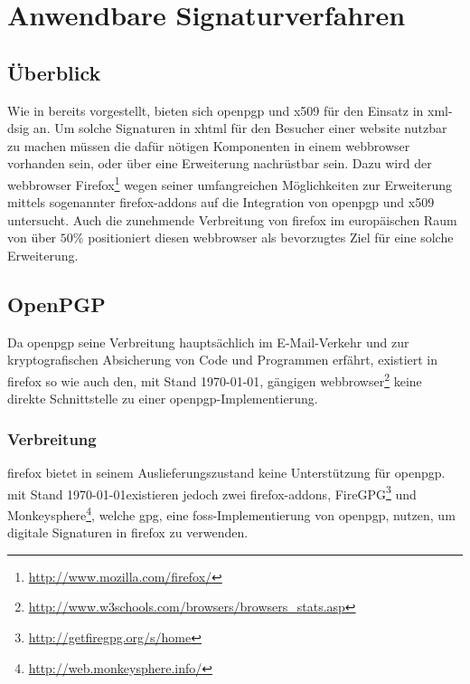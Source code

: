 
\chapter{Anwendbare Signaturverfahren}
\label{chap:Signaturverfahren}

\section{Überblick}
Wie in  bereits vorgestellt, bieten sich \gls{openpgp} und \gls{x509} für den Einsatz in
\gls{xml-dsig} an. Um solche Signaturen in \gls{xhtml} für den Besucher einer \gls{website} nutzbar zu machen müssen die dafür nötigen Komponenten in einem
\gls{webbrowser} vorhanden sein, oder über eine Erweiterung nachrüstbar sein. Dazu wird der \gls{webbrowser}
Firefox\footnote{\url{http://www.mozilla.com/firefox/}} wegen seiner umfangreichen Möglichkeiten zur Erweiterung mittels sogenannter
\glspl{firefox-addon} auf die Integration von \gls{openpgp} und \gls{x509} untersucht. Auch die zunehmende Verbreitung von \gls{firefox} im europäischen Raum
von über $50\%$ \cite{firefox-verbreitung} positioniert diesen \gls{webbrowser} als bevorzugtes Ziel für eine solche Erweiterung.

\section{OpenPGP}
\label{sec:Signaturverfahren:OpenPGP}
Da \gls{openpgp} seine Verbreitung hauptsächlich im E-Mail-Verkehr und zur kryptografischen Absicherung von Code und Programmen erfährt, existiert in
\gls{firefox} so wie auch den, mit Stand \today, gängigen \gls{webbrowser}\footnote{\url{http://www.w3schools.com/browsers/browsers_stats.asp}} keine direkte
Schnittstelle zu einer \gls{openpgp}-Implementierung.

\subsection{Verbreitung}
\gls{firefox} bietet in seinem Auslieferungszustand keine Unterstützung für \gls{openpgp}. mit Stand \today existieren jedoch zwei \glspl{firefox-addon},
FireGPG\footnote{\url{http://getfiregpg.org/s/home}} und
Monkeysphere\footnote{\url{http://web.monkeysphere.info/}}, welche \gls{gpg}, eine \gls{foss}-Implementierung von \gls{openpgp},
nutzen, um digitale Signaturen in \gls{firefox} zu verwenden.

